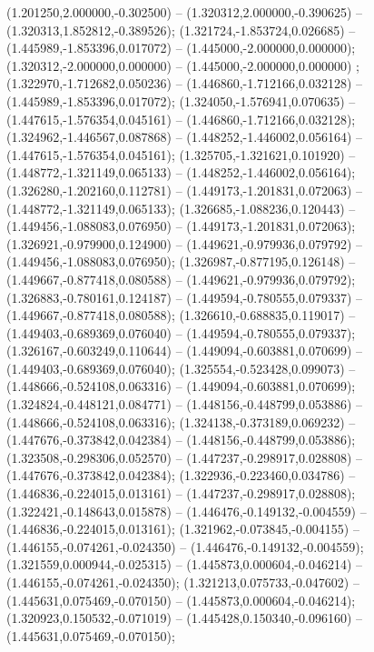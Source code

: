  (1.201250,2.000000,-0.302500) -- (1.320312,2.000000,-0.390625) -- (1.320313,1.852812,-0.389526);
 (1.321724,-1.853724,0.026685) -- (1.445989,-1.853396,0.017072) -- (1.445000,-2.000000,0.000000);
 (1.320312,-2.000000,0.000000) -- (1.445000,-2.000000,0.000000) ;
 (1.322970,-1.712682,0.050236) -- (1.446860,-1.712166,0.032128) -- (1.445989,-1.853396,0.017072);
 (1.324050,-1.576941,0.070635) -- (1.447615,-1.576354,0.045161) -- (1.446860,-1.712166,0.032128);
 (1.324962,-1.446567,0.087868) -- (1.448252,-1.446002,0.056164) -- (1.447615,-1.576354,0.045161);
 (1.325705,-1.321621,0.101920) -- (1.448772,-1.321149,0.065133) -- (1.448252,-1.446002,0.056164);
 (1.326280,-1.202160,0.112781) -- (1.449173,-1.201831,0.072063) -- (1.448772,-1.321149,0.065133);
 (1.326685,-1.088236,0.120443) -- (1.449456,-1.088083,0.076950) -- (1.449173,-1.201831,0.072063);
 (1.326921,-0.979900,0.124900) -- (1.449621,-0.979936,0.079792) -- (1.449456,-1.088083,0.076950);
 (1.326987,-0.877195,0.126148) -- (1.449667,-0.877418,0.080588) -- (1.449621,-0.979936,0.079792);
 (1.326883,-0.780161,0.124187) -- (1.449594,-0.780555,0.079337) -- (1.449667,-0.877418,0.080588);
 (1.326610,-0.688835,0.119017) -- (1.449403,-0.689369,0.076040) -- (1.449594,-0.780555,0.079337);
 (1.326167,-0.603249,0.110644) -- (1.449094,-0.603881,0.070699) -- (1.449403,-0.689369,0.076040);
 (1.325554,-0.523428,0.099073) -- (1.448666,-0.524108,0.063316) -- (1.449094,-0.603881,0.070699);
 (1.324824,-0.448121,0.084771) -- (1.448156,-0.448799,0.053886) -- (1.448666,-0.524108,0.063316);
 (1.324138,-0.373189,0.069232) -- (1.447676,-0.373842,0.042384) -- (1.448156,-0.448799,0.053886);
 (1.323508,-0.298306,0.052570) -- (1.447237,-0.298917,0.028808) -- (1.447676,-0.373842,0.042384);
 (1.322936,-0.223460,0.034786) -- (1.446836,-0.224015,0.013161) -- (1.447237,-0.298917,0.028808);
 (1.322421,-0.148643,0.015878) -- (1.446476,-0.149132,-0.004559) -- (1.446836,-0.224015,0.013161);
 (1.321962,-0.073845,-0.004155) -- (1.446155,-0.074261,-0.024350) -- (1.446476,-0.149132,-0.004559);
 (1.321559,0.000944,-0.025315) -- (1.445873,0.000604,-0.046214) -- (1.446155,-0.074261,-0.024350);
 (1.321213,0.075733,-0.047602) -- (1.445631,0.075469,-0.070150) -- (1.445873,0.000604,-0.046214);
 (1.320923,0.150532,-0.071019) -- (1.445428,0.150340,-0.096160) -- (1.445631,0.075469,-0.070150);
